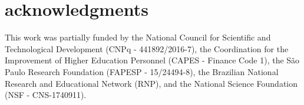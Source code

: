 \section*{acknowledgments}
This work was partially funded by the National Council for Scientific and Technological Development (CNPq - 441892/2016-7), the Coordination for the Improvement of Higher Education Personnel (CAPES - Finance Code 1), the São Paulo Research Foundation (FAPESP - 15/24494-8), the Brazilian National Research and Educational Network (RNP), and the National Science Foundation (NSF - CNS-1740911).